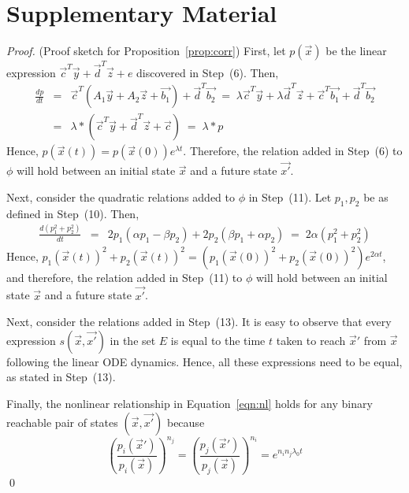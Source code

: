 \documentclass{llncs}
\begin{document}
\section{Supplementary Material}
\begin{proof}(Proof sketch for Proposition~\ref{prop:corr})
First, let $p(\vec{x})$ be the linear expression
$\vec{c}^T\vec{y}+\vec{d}^T\vec{z}+e$ discovered in Step~(6).
Then,
\begin{eqnarray*}
\frac{dp}{dt} &=& \vec{c}^T(A_1\vec{y}+A_2\vec{z}+\vec{b_1}) +
 \vec{d}^T\vec{b_2}
\; = \; \lambda\vec{c}^T\vec{y}+\lambda\vec{d}^T\vec{z}+\vec{c}^T\vec{b_1} + \vec{d}^T\vec{b_2}
\\
& = & \lambda*(\vec{c}^T\vec{y}+\vec{d}^T\vec{z}+\vec{c})
\; = \; \lambda*p
\end{eqnarray*}
Hence, $p(\vec{x}(t)) = p(\vec{x}(0)) e^{\lambda t}$.
Therefore, the relation added in Step~(6) to $\phi$ 
will hold between an initial state $\vec{x}$ and a future
state $\vec{x'}$.

Next, consider the quadratic relations added to $\phi$ 
in Step~(11).  Let $p_1,p_2$ be as defined in Step~(10).
Then,
\begin{eqnarray*}
\frac{d(p_1^2+p_2^2)}{dt} 
& = &
 2p_1(\alpha p_1-\beta p_2)+2p_2(\beta p_1+\alpha p_2)
\; = \;
 2\alpha(p_1^2 + p_2^2)
\end{eqnarray*}
Hence, 
$p_1(\vec{x}(t))^2+p_2(\vec{x}(t))^2 = 
 (p_1(\vec{x}(0))^2+p_2(\vec{x}(0))^2) e^{2\alpha t}$,
and therefore, the relation added in Step~(11) to $\phi$
will hold between an initial state $\vec{x}$ and a future
state $\vec{x'}$.

Next, consider the relations added in Step~(13).
It is easy to observe that every expression $s(\vec{x},\vec{x'})$ 
in the set $E$ is equal to the time $t$ taken to reach $\vec{x}'$
from $\vec{x}$ following the linear ODE dynamics.
Hence, all these expressions need to be equal, as stated in Step~(13).

Finally, the nonlinear relationship in Equation~\ref{eqn:nl}
holds for any binary reachable
pair of states $(\vec{x},\vec{x'})$ 
because
$$
 \left(\frac{p_i(\vec{x}')}{p_i(\vec{x})}\right)^{n_j} 
 = 
 \left(\frac{p_j(\vec{x}')}{p_j(\vec{x})}\right)^{n_i} 
 =
 e^{n_in_j\lambda_0 t}
$$
\qed
\end{proof}
\end{document}
